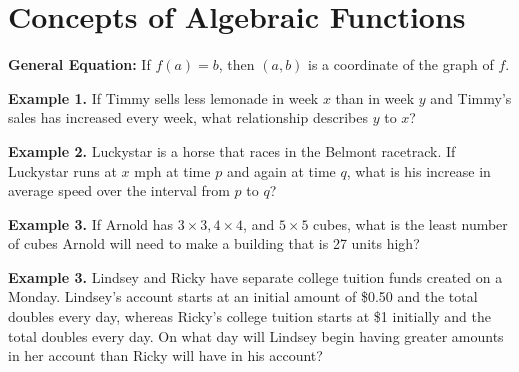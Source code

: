 \section{Concepts of Algebraic Functions}

\bigskip
\textbf{General Equation:} If $f(a)=b$, then $(a,b)$ is a coordinate of the graph of $f$.

\vfill
\textbf{Example 1.} If Timmy sells less lemonade in week $x$ than in week $y$ and Timmy's sales has increased every week, what relationship describes $y$ to $x$?

\vfill
\textbf{Example 2.} Luckystar is a horse that races in the Belmont racetrack. If Luckystar runs at $x$ mph at time $p$ and again at time $q$, what is his increase in average speed over the interval from $p$ to $q$?

\vfill
\textbf{Example 3.} If Arnold has $3\times3, 4\times4$, and $5\times5$ cubes, what is the least number of cubes Arnold will need to make a building that is 27 units high?

\vfill
\textbf{Example 3.} Lindsey and Ricky have separate college tuition funds created on a Monday. Lindsey's account starts at an initial amount of \$0.50 and the total doubles every day, whereas Ricky's college tuition starts at \$1 initially and the total doubles every day. On what day will Lindsey begin having greater amounts in her account than Ricky will have in his account?

